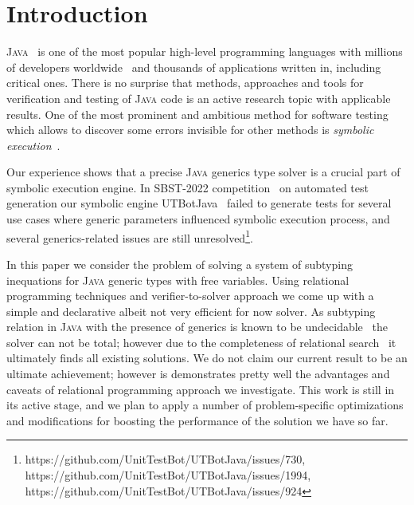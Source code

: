 \section{Introduction}
\label{sec:intro}

\textsc{Java}~\cite{java} is one of the most popular high-level programming languages with millions of developers worldwide~\cite{tiobe} and
thousands of applications written in, including critical ones. There is no surprise that methods, approaches and tools for verification and testing
of \textsc{Java} code is an active research topic with applicable results. One of the most prominent and ambitious method for software testing  which
allows to discover some errors invisible for other methods is \emph{symbolic execution}~\cite{Symbolic}.

Our experience shows that a precise \textsc{Java} generics type solver is a crucial part of symbolic execution engine. In SBST-2022 competition~\cite{SBCT} on
automated test generation our symbolic engine UTBotJava~\cite{UTBot} failed to generate tests for several use cases where generic parameters influenced
symbolic execution process, and several generics-related issues are still unresolved\footnote{https://github.com/UnitTestBot/UTBotJava/issues/730, https://github.com/UnitTestBot/UTBotJava/issues/1994, https://github.com/UnitTestBot/UTBotJava/issues/924}.

In this paper we consider the problem of solving a system of subtyping inequations for \textsc{Java} generic types with free variables. Using relational programming techniques and
verifier-to-solver approach we come up with a simple and declarative albeit not very efficient for now solver. As subtyping relation in \textsc{Java} with the presence of
generics is known to be undecidable~\cite{JGTC} the solver can not be total; however due to the completeness of relational search~\cite{certified} it ultimately
finds all existing solutions. We do not claim our current result to be an ultimate achievement; 
however is demonstrates pretty well the advantages and caveats of relational programming approach we investigate. This work is still in its active stage, and we
plan to apply a number of problem-specific optimizations and modifications for boosting the performance of the solution we have so far.


